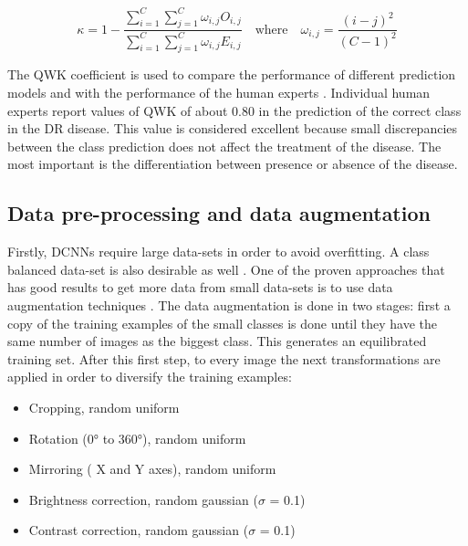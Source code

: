 \begin{equation}\label{ccia2016:eq:kappa}
\kappa = 1 - \frac{ \sum_{i=1}^C \sum_{j=1}^C \omega_{i,j} O_{i,j} }
{\sum_{i=1}^C \sum_{j=1}^C  \omega_{i,j} E_{i,j}}
\quad \textrm{where} \quad \omega_{i,j} = \frac{(i-j)^2}{(C - 1)^2}
\end{equation}



The QWK coefficient is used to compare the performance of different prediction models and with the performance of the human experts \citep{kappa-benchmark}. Individual human experts report values of QWK of about 0.80 in the prediction of the correct class in the DR disease. This value is considered excellent because small discrepancies between the class prediction does not affect the treatment of the disease. The most important is the differentiation between presence or absence of the disease. 

\subsection{Data pre-processing and data augmentation}


Firstly, DCNNs require large data-sets in order to avoid overfitting. A class balanced data-set is also desirable as well \citep{class-imbalance}. One of the proven approaches that has good results to get more data from small data-sets is to use data augmentation techniques \citep{Krizhevsky:2012}. The data augmentation is done in two stages: first a copy of the training examples of the small classes is done until they have the same number of images as the biggest class. This generates an equilibrated training set. After this first step, to every image the next transformations are applied in order to diversify the training examples:

\begin{itemize}
	\item Cropping, random uniform
	\item Rotation (\ang{0} to \ang{360}), random uniform
	\item Mirroring ( X and Y axes), random uniform
	\item Brightness correction, random gaussian ($\sigma$ = 0.1)
	\item Contrast correction, random gaussian ($\sigma$ = 0.1)
\end{itemize}

